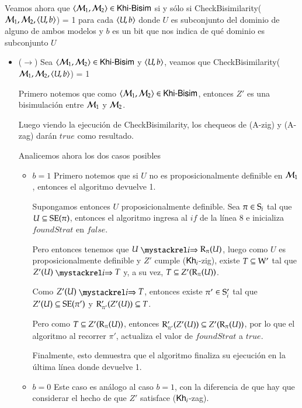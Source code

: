 \begin{demostracion}
    Veamos ahora que $\tup{\modults_1,\modults_2} \in \KHiBisim$ si y sólo si
    CheckBisimilarity($\modults_1,\modults_2,\tup{U,b}$) = 1 para cada $\tup{U,b}$ donde $U$ es subconjunto 
    del dominio de alguno de ambos modelos y $b$ es un bit que nos indica de qué dominio es subconjunto $U$

    \begin{itemize}
        \item ($\rightarrow$)
        Sea $\tup{\modults_1,\modults_2} \in \KHiBisim$ y $\tup{U,b}$, 
        veamos que CheckBisimilarity($\modults_1,\modults_2,\tup{U,b}$) = 1

        Primero notemos que como $\tup{\modults_1,\modults_2} \in \KHiBisim$, entonces $Z'$ es una bisimulación 
        entre $\modults_1$ y $\modults_2$.

        Luego viendo la ejecución de CheckBisimilarity, los chequeos de (A-zig) y (A-zag) darán $true$ como resultado.
        
        Analicemos ahora los dos casos posibles

        \begin{itemize}
            \item $b = 1$
                Primero notemos que si $U$ no es proposicionalmente definible en $\modults_1$, entonces el algoritmo devuelve 1.

                Supongamos entonces $U$ proposicionalmente definible. Sea $\pi \in \S_i$ tal que $U \subseteq \sexec(\pi)$, 
                entonces el algoritmo ingresa al $if$ de la línea 8 e inicializa $foundStrat$ en $false$.
                
                Pero entonces tenemos que $U \ultsExecAgi \R_\pi(U)$, luego como $U$ es proposicionalmente definible y 
                $Z'$ cumple ($\khi$-zig), existe $T \subseteq \W'$ tal que $Z'(U) \ultsExecAgi T$ y,
                a su vez, $T \subseteq Z'(\R_\pi(U))$.
                
                Como $Z'(U) \ultsExecAgi T$, entonces existe $\pi' \in \S_i'$ tal que $Z'(U) \subseteq \sexec(\pi')$ y 
                $\R'_{\pi'}(Z'(U)) \subseteq T$.
                
                Pero como $T \subseteq Z'(\R_\pi(U))$, entonces $\R'_{\pi'}(Z'(U)) \subseteq Z'(\R_\pi(U))$, por lo que 
                el algoritmo al recorrer $\pi'$, actualiza el valor de $foundStrat$ a $true$.
                
                Finalmente, esto demuestra que el algoritmo finaliza su ejecución en la última línea donde devuelve 1.
            \item $b = 0$
                Este caso es análogo al caso $b = 1$, con la diferencia de que hay que considerar el hecho de que 
                $Z'$ satisface ($\khi$-zag).
        \end{itemize}


\end{itemize}
\end{demostracion}
